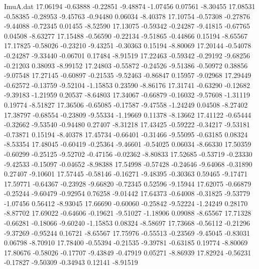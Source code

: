 \begin{filecontents}{ImuA.dat}
  17.06194   -0.63888   -0.22851   -9.48874   -1.07456    0.07561   -8.30455
  17.08531   -0.58385   -0.28953   -9.45763   -0.94480    0.06034   -8.40378
  17.10754   -0.57308   -0.27876   -9.44088   -0.72345    0.01455   -8.52590
  17.13075   -0.59342   -0.24287   -9.41815   -0.67765    0.04508   -8.63277
  17.15488   -0.56590   -0.22134   -9.51865   -0.44866    0.15194   -8.65567
  17.17825   -0.58026   -0.23210   -9.43251   -0.30363    0.15194   -8.80069
  17.20144   -0.54078   -0.24287   -9.33440   -0.06701    0.17484   -8.91519
  17.22463   -0.59342   -0.29192   -9.68256   -0.21203    0.38093   -8.99152
  17.24803   -0.55872   -0.24526   -9.51386   -0.50972    0.38856   -9.07548
  17.27145   -0.60897   -0.21535   -9.52463   -0.86847    0.15957   -9.02968
  17.29449   -0.62572   -0.13759   -9.52104   -1.15853    0.23590   -8.86176
  17.31741   -0.63290   -0.12682   -9.39183   -1.21959    0.20537   -8.64803
  17.34067   -0.66879   -0.16032   -9.57608   -1.31119    0.19774   -8.51827
  17.36506   -0.65085   -0.17587   -9.47558   -1.24249    0.04508   -8.27402
  17.38797   -0.68554   -0.23809   -9.55334   -1.19669    0.11378   -8.13662
  17.41122   -0.65444   -0.32662   -9.53540   -0.94480    0.27407   -8.31218
  17.43425   -0.59222   -0.34217   -9.53181   -0.73871    0.15194   -8.40378
  17.45734   -0.66401   -0.31466   -9.55095   -0.63185    0.08324   -8.53354
  17.48045   -0.60419   -0.25364   -9.46601   -0.54025    0.06034   -8.66330
  17.50359   -0.60299   -0.25125   -9.52702   -0.47156   -0.02362   -8.80833
  17.52685   -0.53719   -0.23330   -9.42533   -0.15097   -0.04652   -8.98388
  17.54998   -0.57428   -0.24646   -9.64068   -0.31890    0.27407   -9.10601
  17.57445   -0.58146   -0.16271   -9.48395   -0.30363    0.59465   -9.17471
  17.59771   -0.64367   -0.23928   -9.66820   -0.72345    0.52596   -9.15944
  17.62075   -0.66879   -0.25244   -9.60479   -0.92954    0.76258   -9.01442
  17.64373   -0.64008   -0.31825   -9.53779   -1.07456    0.56412   -8.93045
  17.66690   -0.60060   -0.25842   -9.52224   -1.24249    0.28170   -8.87702
  17.69022   -0.64606   -0.19621   -9.51027   -1.18906    0.09088   -8.65567
  17.71328   -0.66281   -0.18066   -9.60240   -1.15853    0.08324   -8.58697
  17.73668   -0.56112   -0.21296   -9.37269   -0.95244    0.16721   -8.65567
  17.75976   -0.55513   -0.23569   -9.45045   -0.83031    0.06798   -8.70910
  17.78400   -0.55394   -0.21535   -9.39781   -0.63185    0.19774   -8.80069
  17.80676   -0.58026   -0.17707   -9.43849   -0.47919    0.05271   -8.86939
  17.82924   -0.56231   -0.17827   -9.50309   -0.34943    0.12141   -8.91519

\end{filecontents}
